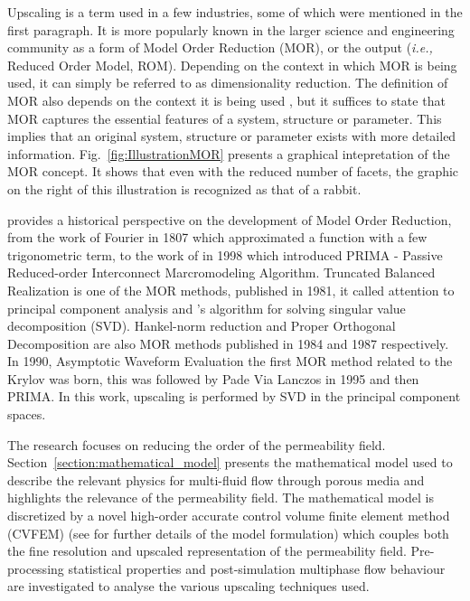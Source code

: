 \documentclass[preprint,12pt]{elsarticle}
\newcommand{\ie}{{\it i.e., }}
\begin{document}
Upscaling is a term used in a few industries, some of which were mentioned in the first paragraph. It is more popularly known in the larger science and engineering community as a form of Model Order Reduction (MOR), or the output (\ie Reduced Order Model, ROM). Depending on the context in which MOR is being used, it can simply be referred to as dimensionality reduction. The definition of MOR also depends on the context it is being used \cite{Schilders2008}, but it suffices to state that MOR captures the essential features of a system, structure or parameter. This implies that an original system, structure or parameter exists with more detailed information. Fig.~\ref{fig:IllustrationMOR} presents a graphical intepretation of the MOR concept. It shows that even with the reduced number of facets, the graphic on the right of this illustration is recognized as that of a rabbit. 

\citet{Schilders2008} provides a historical perspective on the development of Model Order Reduction, from the work of Fourier in 1807 which approximated a function with a few trigonometric term, to the work of \citet{Odabasioglu_1998} in 1998 which introduced PRIMA - Passive Reduced-order Interconnect Marcromodeling Algorithm. Truncated Balanced Realization \cite{Moore_1981} is one of the MOR methods, published in 1981, it called attention to principal component analysis \cite{Hotelling_1933} and \citeauthor{Golub1970}'s \cite{Golub1970} algorithm for solving singular value decomposition (SVD). Hankel-norm reduction \cite{Glover_1984} and Proper Orthogonal Decomposition \cite{Sirovich_1987} are also MOR methods published in 1984 and 1987 respectively. In 1990, Asymptotic Waveform Evaluation \cite{Pillage_1990} the first MOR method related to the Krylov was born, this was followed by Pade Via Lanczos \cite{Feldmann_1995} in 1995 and then PRIMA. In this work, upscaling is performed by SVD in the principal component spaces.

The research focuses on reducing the order of the permeability field. Section~\ref{section:mathematical_model} presents the mathematical model used to describe the relevant physics for multi-fluid flow through porous media and highlights the relevance of the permeability field. The mathematical model is discretized by a novel high-order accurate control volume finite element method (CVFEM) (see \cite{Gomes_2017} for further details of the model formulation) which couples both the fine resolution and upscaled representation of the permeability field. Pre-processing statistical properties and post-simulation multiphase flow behaviour are investigated to analyse the various upscaling techniques used.
\end{document}
